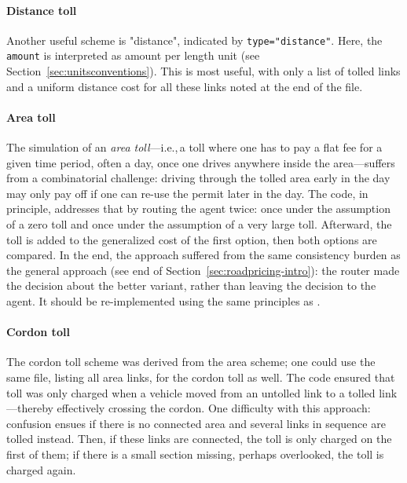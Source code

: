 \paragraph{Distance toll} Another useful scheme is "distance", indicated by \lstinline$type="distance"$. Here, the \lstinline$amount$ is interpreted as amount per length unit (see Section~\ref{sec:unitsconventions}). This is most useful, with only a list of tolled links and a uniform distance cost for all these links noted at the end of the file.

\paragraph{Area toll} The simulation of an \emph{area toll}---i.e.,\,a toll where one has to pay a flat fee for a given time period, often a day, once one drives anywhere inside the area---suffers from a combinatorial challenge: driving through the tolled area early in the day may only pay off if one can re-use the permit later in the day. The code, in principle, addresses that by routing the agent twice: once under the assumption of a zero toll and once under the assumption of a very large toll. Afterward, the toll is added to the generalized cost of the first option, then both options are compared.  
%
In the end, the approach suffered from the same consistency burden as the general approach (see end of Section~\ref{sec:roadpricing-intro}): the router made the decision about the better variant, rather than leaving the decision to the agent. It should be re-implemented using the same principles as \citet{NagelKickhoeferJoubert2014HeterogeneousVoTsPROCEDIA}.

\paragraph{Cordon toll} The cordon toll scheme was derived from the area scheme; one could use the same file, listing all area links, for the cordon toll as well. The code ensured that toll was only charged when a vehicle moved from an untolled link to a tolled link---thereby effectively crossing the cordon. One difficulty with this approach: confusion ensues if there is no connected area and several links in sequence are tolled instead.  Then, if these links are connected, the toll is only charged on the first of them; if there is a small section missing, perhaps overlooked, the toll is charged again. 


